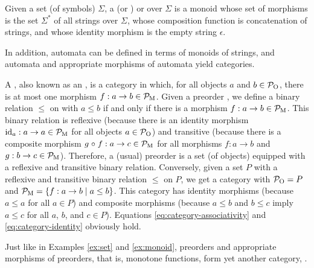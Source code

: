 \begin{example}


  \label{ex:monoid-strings}


  Given a set (of symbols) $\Sigma$, a  (or
  ) or  over $\Sigma$ is a monoid whose
  set of morphisms is the set $\Sigma^{*}$ of all strings over
  $\Sigma$, whose composition function is concatenation of strings,
  and whose identity morphism is the empty string $\epsilon$.



  In addition, automata can be defined in terms of monoids of strings,
  and automata and appropriate morphisms of automata yield categories.


\end{example}

\begin{example}
  [Preorders]


  \label{ex:preorder}


  A  , also known as an ,
  is a category in which, for all objects $a$ and $b \in \mathcal{P}_{\operatorname{O}}$,
  there is at most one morphism $f: a \to b \in \mathcal{P}_{\operatorname{M}}$. Given a
  preorder , we define a binary relation $\leq$ on 
  with $a \leq b$ if and only if there is a morphism $f: a \to b \in
  \mathcal{P}_{\operatorname{M}}$. This binary relation is reflexive (because there is an
  identity morphism $\operatorname{id}_{a}: a \to a \in \mathcal{P}_{\operatorname{M}}$ for all objects $a
  \in \mathcal{P}_{\operatorname{O}}$) and transitive (because there is a composite morphism
  $g \mathrel{\circ} f: a \to c \in \mathcal{P}_{\operatorname{M}}$ for all morphisms $f: a \to b$ and
  $g: b \to c \in \mathcal{P}_{\operatorname{M}}$). Therefore, a (usual) preorder is a set
  (of objects) equipped with a reflexive and transitive binary
  relation. Conversely, given a set $P$ with a reflexive and
  transitive binary relation $\leq$ on $P$, we get a category 
  with $\mathcal{P}_{\operatorname{O}} = P$ and $\mathcal{P}_{\operatorname{M}} = \{f: a \to b \mid a \leq b\}$.
  This category has identity morphisms (because $a \leq a$ for all $a
  \in P$) and composite morphisms (because $a \leq b$ and $b \leq c$
  imply $a \leq c$ for all $a$, $b$, and $c \in P$). Equations
  \eqref{eq:category-associativity} and \eqref{eq:category-identity}
  obviously hold.

  Just like in Examples \ref{ex:set} and
  \ref{ex:monoid}, preorders and appropriate morphisms of
  preorders, that is, monotone functions, form yet another category,
  .

\end{example}

